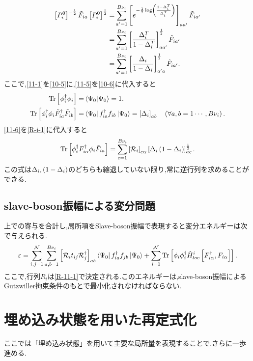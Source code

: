 \begin{equation}
\begin{split}
    \left[ P^{0}_{i} \right]^{-\frac{1}{2}}\tilde{F}_{ia}\left[ P^{0}_{i} \right]^{\frac{1}{2}}=&\sum_{a'=1}^{B\nu_{i}}\left[ e^{-\frac{1}{2}\log \left( \frac{1-\Delta^{T}_{i}}{\Delta^{T}_{i}} \right)} \right]_{aa'}\tilde{F}_{ia'}\\
    =&\sum_{a'=1}^{B\nu_{i}}\left[ \frac{\Delta^{T}_{i}}{1-\Delta^{T}_{i}} \right]_{aa'}^{\frac{1}{2}}\tilde{F}_{ia'}\\
    =&\sum_{a'=1}^{B\nu_{i}}\left[ \frac{\Delta_{i}}{1-\Delta_{i}} \right]_{a'a}^{\frac{1}{2}}\tilde{F}_{ia'}.  \label{11-6} \\
\end{split}
\end{equation}
ここで,\eqref{11-1}を\eqref{10-5}に,\eqref{11-5}を\eqref{10-6}に代入すると
\begin{align}
    \Tr \left[ \phi^\dagger_{i}\phi_{i} \right]=&\braket{\Psi_{0}}=1. \label{11-7}\\
    \Tr \left[ \phi^\dagger_{i}\phi_{i}\tilde{F}^\dagger_{ia}\tilde{F}_{ib} \right]=&\Bra{\Psi_{0}}f^\dagger_{ia}f_{ib}\Ket{\Psi_{0}}=\left[ \Delta_{i} \right]_{ab}\quad \left( \forall a,b=1\cdots, B\nu_{i} \right).\label{11-8}
\end{align}
\eqref{11-6}を\eqref{R-i-1}に代入すると
\begin{equation}
    \Tr \left[ \phi^\dagger_{i}F^\dagger_{i\alpha}\phi_{i}\tilde{F}_{ia} \right]=\sum_{c=1}^{B\nu_{i}}\left[ \mathcal{R}_{i} \right]_{c\alpha}\left[ \Delta_{i}\left( 1-\Delta_{i} \right) \right]_{ac}^{\frac{1}{2}}. \label{R-11-1}
\end{equation}
この式は$\Delta_{i},\left( 1-\Delta_{i} \right)$のどちらも縮退していない限り,常に逆行列を求めることができる.
\subsection{slave-boson振幅による変分問題}
上での寄与を合計し,局所項をSlave-boson振幅で表現すると変分エネルギーは次で与えられる.
\begin{equation}
    \varepsilon=\sum_{i,j=1}^{\mathcal{N}}\sum_{a,b=1}^{B\nu_{i}}\left[ \mathcal{R}_{i}t_{ij}\mathcal{R}^\dagger_{j} \right]_{ab}\Bra{\Psi_{0}}f^\dagger_{ia}f_{jb}\Ket{\Psi_{0}}+\sum_{i=1}^{\mathcal{N}}\Tr \left[ \phi_{i}\phi^\dagger_{i}\hat{H}^{i}_{loc}\left[ F^\dagger_{i\alpha},F_{i\alpha} \right] \right].
\end{equation}
ここで,行列$R_{i}$は\eqref{R-11-1}で決定される.このエネルギーは,slave-boson振幅によるGutzwiller拘束条件のもとで最小化されなければならない.

\section{埋め込み状態を用いた再定式化}
ここでは「埋め込み状態」を用いて主要な局所量を表現することで,さらに一歩進める.

